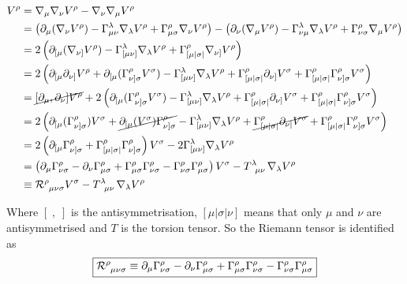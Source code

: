 \begin{align}
[\nabla_\mu,\nabla_\nu]V^\rho &= \nabla_\mu\nabla_\nu V^\rho - \nabla_\nu\nabla_\mu V^\rho \\
&= \left(\partial_\mu(\nabla_\nu V^\rho) - \Gamma^\lambda_{\mu\nu}\nabla_\lambda V^\rho + \Gamma^\rho_{\mu\sigma}\nabla_\nu V^\rho \right) - \left(\partial_\nu(\nabla_\mu V^\rho) - \Gamma^\lambda_{\nu\mu}\nabla_\lambda V^\rho + \Gamma^\rho_{\nu\sigma}\nabla_\mu V^\rho \right) \\
&= 2\left(\partial_{[\mu}(\nabla_{\nu]} V^\rho) - \Gamma^\lambda_{[\mu\nu]}\nabla_\lambda V^\rho + \Gamma^\rho_{[\mu|\sigma|}\nabla_{\nu]} V^\rho \right) \\
&= 2\left(\partial_{[\mu}\partial_{\nu]} V^\rho + \partial_{[\mu}(\Gamma^\rho_{\nu]\sigma} V^\sigma) - \Gamma^\lambda_{[\mu\nu]}\nabla_\lambda V^\rho + \Gamma^\rho_{[\mu|\sigma|}\partial_{\nu]} V^\sigma + \Gamma^\rho_{[\mu|\sigma|}\Gamma^\rho_{\nu]\sigma} V^\sigma \right) \\
&= \cancel{[\partial_{\mu}, \partial_{\nu}] V^\rho} + 2\left(\partial_{[\mu}(\Gamma^\rho_{\nu]\sigma} V^\sigma) - \Gamma^\lambda_{[\mu\nu]}\nabla_\lambda V^\rho + \Gamma^\rho_{[\mu|\sigma|}\partial_{\nu]} V^\sigma + \Gamma^\rho_{[\mu|\sigma|}\Gamma^\rho_{\nu]\sigma} V^\sigma \right) \\
&= 2\left(\partial_{[\mu}(\Gamma^\rho_{\nu]\sigma}) V^\sigma + \cancel{\partial_{[\mu}( V^\sigma)\Gamma^\rho_{\nu]\sigma}} - \Gamma^\lambda_{[\mu\nu]}\nabla_\lambda V^\rho + \cancel{\Gamma^\rho_{[\mu|\sigma|}\partial_{\nu]} V^\sigma} + \Gamma^\rho_{[\mu|\sigma|}\Gamma^\rho_{\nu]\sigma} V^\sigma \right) \\
&= 2\left(\partial_{[\mu}\Gamma^\rho_{\nu]\sigma} + \Gamma^\rho_{[\mu|\sigma|}\Gamma^\rho_{\nu]\sigma} \right) V^\sigma - 2\Gamma^\lambda_{[\mu\nu]}\nabla_\lambda V^\rho \\
&= \left(\partial_{\mu}\Gamma^\rho_{\nu\sigma} - \partial_{\nu}\Gamma^\rho_{\mu\sigma} + \Gamma^\rho_{\mu\sigma}\Gamma^\rho_{\nu\sigma} - \Gamma^\rho_{\nu\sigma}\Gamma^\rho_{\mu\sigma} \right) V^\sigma - \tensor{T}{^\lambda_{\mu\nu}}\nabla_\lambda V^\rho \\
&\equiv \tensor{\mathcal{R}}{^\rho_{\mu\nu\sigma}}V^\sigma - \tensor{T}{^\lambda_{\mu\nu}}\nabla_\lambda V^\rho
\end{align}

Where $[\;,\;]$ is the antisymmetrisation, $[\mu|\sigma|\nu]$ means that only $\mu$ and $\nu$ are antisymmetrised and $T$ is the torsion tensor. So the Riemann tensor is identified as
\[ \boxed{\tensor{\mathcal{R}}{^\rho_{\mu\nu\sigma}} \equiv \partial_{\mu}\Gamma^\rho_{\nu\sigma} - \partial_{\nu}\Gamma^\rho_{\mu\sigma} + \Gamma^\rho_{\mu\sigma}\Gamma^\rho_{\nu\sigma} - \Gamma^\rho_{\nu\sigma}\Gamma^\rho_{\mu\sigma}} \]

